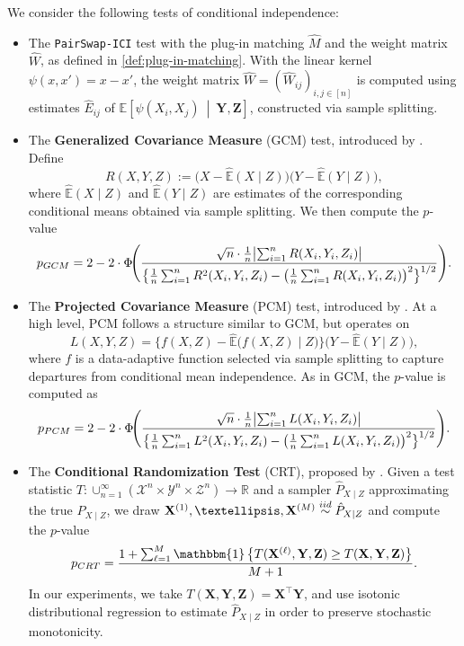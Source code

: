 \documentclass[12pt]{article}
\newcommand{\EEst}[2]{\mathbb{E}\left[{#1}\  \middle| \ {#2}\right]}
\newcommand{\One}[1]{{\mathbbm{1}}\left\{{#1}\right\}}
\newcommand{\iidsim}{\stackrel{\textnormal{iid}}{\sim}}
\newcommand{\bX}{\mathbf{X}}
\newcommand{\bY}{\mathbf{Y}}
\newcommand{\bZ}{\mathbf{Z}}
\begin{document}
We consider the following tests of conditional independence:
\begin{itemize}
    \item The \texttt{PairSwap-ICI} test with the plug-in matching $\hat{M}$ and the weight matrix $\hat{W}$, as defined in \eqref{def:plug-in-matching}.  With the linear kernel $\psi(x,x')=x-x'$, the weight matrix $\hat{W}= (\hat{W}_{ij})_{i,j \in [n]}$ is computed using estimates $\hat{E}_{ij}$ of $\EEst{\psi(X_i, X_j)}{\bY, \bZ}$, constructed via sample splitting.
    
    \item The \textbf{Generalized Covariance Measure} (GCM) test, introduced by \citet{shah2020hardness}. Define
    \[
    R(X,Y,Z):=\bigl(X-\hat{\mathbb{E}}(X\mid Z)\bigr)\bigl(Y-\hat{\mathbb{E}}(Y\mid Z)\bigr),
    \]
    where $\hat{\mathbb{E}}(X\mid Z)$ and $\hat{\mathbb{E}}(Y\mid Z)$ are estimates of the corresponding conditional means obtained via sample splitting. We then compute the $p$-value
    \[
    p_{\rm GCM}
    =
    2-2\cdot\Phi\!\Biggl(
    \frac{\sqrt{n}\cdot \frac{1}{n}\bigl|\sum_{i=1}^n R(X_i,Y_i,Z_i)\bigr|}
    {\bigl\{\frac{1}{n}\sum_{i=1}^n R^2(X_i,Y_i,Z_i)
    -\bigl(\frac{1}{n}\sum_{i=1}^n R(X_i,Y_i,Z_i)\bigr)^2\bigr\}^{1/2}}
    \Biggr).
    \]

    \item The \textbf{Projected Covariance Measure} (PCM) test, introduced by \citet{lundborg2022projected}. At a high level, PCM follows a structure similar to GCM, but operates on
    \[
    L(X,Y,Z)
    =
    \bigl\{f(X,Z)-\hat{\mathbb{E}}\bigl(f(X,Z)\mid Z\bigr)\bigr\}
    \bigl(Y-\hat{\mathbb{E}}(Y\mid Z)\bigr),
    \]
    where $f$ is a data-adaptive function selected via sample splitting to capture departures from conditional mean independence. As in GCM, the $p$-value is computed as
    \[
    p_{\rm PCM}
    =
    2-2\cdot
    \Phi\!\Biggl(
    \frac{\sqrt{n}\cdot \frac{1}{n}\bigl|\sum_{i=1}^n L(X_i,Y_i,Z_i)\bigr|}
    {\bigl\{\frac{1}{n}\sum_{i=1}^n L^2(X_i,Y_i,Z_i)
    -\bigl(\frac{1}{n}\sum_{i=1}^n L(X_i,Y_i,Z_i)\bigr)^2\bigr\}^{1/2}}
    \Biggr).
    \]

    \item The \textbf{Conditional Randomization Test} (CRT), proposed by \citet{candes2018panning}. Given a test statistic
    $T:\cup_{n=1}^\infty(\mathcal{X}^n\times\mathcal{Y}^n\times\mathcal{Z}^n)\to\mathbb{R}$
    and a sampler $\hat{P}_{X\mid Z}$ approximating the true $P_{X\mid Z}$, we draw
    $\bX^{(1)},\ldots,\bX^{(M)}\iidsim\hat{P}_{X\mid Z}$ and compute the $p$-value
    \[
    p_{\rm CRT}
    =
    \frac{1+\sum_{\ell=1}^M
    \One{T(\bX^{(\ell)},\bY,\bZ)\ge T(\bX,\bY,\bZ)}}{M+1}.
    \]
    In our experiments, we take $T(\bX,\bY,\bZ)=\bX^\top\bY$, and use isotonic distributional regression \citep{henzi2021isotonic} to estimate $\hat{P}_{X\mid Z}$ in order to preserve stochastic monotonicity.
\end{itemize}
\end{document}
